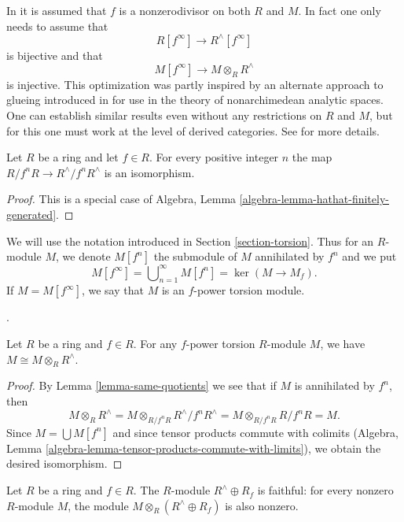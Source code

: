 \medskip\noindent
In \cite{Beauville-Laszlo} it is assumed that $f$ is a nonzerodivisor on
both $R$ and $M$. In fact one only needs to assume that
$$
R[f^\infty] \longrightarrow R^\wedge[f^\infty]
$$
is bijective and that
$$
M[f^\infty] \longrightarrow M \otimes_R R^\wedge
$$
is injective. This optimization was partly inspired by an alternate approach 
to glueing introduced in \cite[\S 1.3]{Kedlaya-Liu-I} for use in the theory of 
nonarchimedean analytic spaces.
One can establish similar results even without any restrictions on $R$ and $M$, 
but for this one must work at the level of derived categories. See
\cite[\S 5]{Bhatt-Algebraize} for more details.

\begin{lemma}
\label{lemma-same-quotients}
Let $R$ be a ring and let $f \in R$. For every positive integer $n$ the map
$R/f^nR \to R^\wedge/f^n R^\wedge$ is an isomorphism.
\end{lemma}

\begin{proof}
This is a special case of Algebra, Lemma
\ref{algebra-lemma-hathat-finitely-generated}.
\end{proof}

\noindent
We will use the notation introduced in Section \ref{section-torsion}.
Thus for an $R$-module $M$, we denote $M[f^n]$ the submodule of
$M$ annihilated by  $f^n$ and we put
$$
M[f^\infty] = \bigcup\nolimits_{n = 1}^\infty M[f^n] = \ker(M \to M_f).
$$
If $M = M[f^\infty]$, we say that $M$ is an $f$-power torsion module.

\begin{lemma}
\label{lemma-torsion-completion}
\begin{reference}
\cite[Lemme~1]{Beauville-Laszlo}.
\end{reference}
Let $R$ be a ring and $f \in R$. For any $f$-power torsion $R$-module $M$,
we have $M \cong M \otimes_R R^\wedge$.
\end{lemma}

\begin{proof}
By Lemma \ref{lemma-same-quotients} we see that if $M$ is annihilated
by $f^n$, then
$$
M \otimes_R R^\wedge =
M \otimes_{R/f^nR} R^\wedge/f^n R^\wedge =
M \otimes_{R/f^nR} R/f^n R = M.
$$
Since $M = \bigcup M[f^n]$ and since tensor products commute
with colimits
(Algebra, Lemma \ref{algebra-lemma-tensor-products-commute-with-limits}),
we obtain the desired isomorphism.
\end{proof}

\begin{lemma}
\label{lemma-BL-faithful}
Let $R$ be a ring and $f \in R$.
The $R$-module $R^\wedge \oplus R_f$ is faithful: for every nonzero 
$R$-module $M$, the module $M \otimes_R (R^\wedge \oplus R_f)$
is also nonzero.
\end{lemma}

